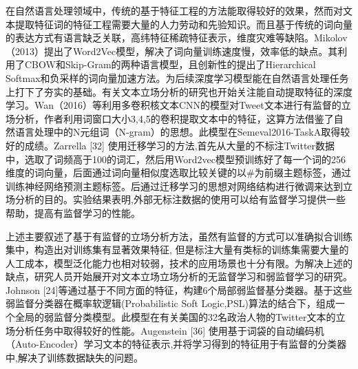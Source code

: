 在自然语言处理领域中，传统的基于特征工程的方法能取得较好的效果，然而对文本提取特征词的特征工程需要大量的人力劳动和先验知识。而且基于传统的词向量的表达方式有语言缺乏关联，高纬特征稀疏特征表示，维度灾难等缺陷。Mikolov（2013）提出了Word2Vec模型，解决了词向量训练速度慢，效率低的缺点。其利用了CBOW和Skip-Gram的两种语言模型，且创新性的提出了Hierarchical Softmax和负采样的词向量加速方法。为后续深度学习模型能在自然语言处理任务上打下了夯实的基础。有关文本立场分析的研究也开始关注能自动提取特征的深度学习。Wan（2016）等利用多卷积核文本CNN的模型对Tweet文本进行有监督的立场分析，作者利用词窗口大小3,4,5的卷积提取文本中的特征，这算方法借鉴了自然语言处理中的N元组词（N-gram）的思想。此模型在Semeval2016-TaskA取得较好的成绩。Zarrella [32] 使用迁移学习的方法,首先从大量的不标注Twitter数据中，选取了词频高于100的词汇，然后用Word2vec模型预训练好了每一个词的256维度的词向量，后面通过词向量相似度选取比较关键的以\#为前缀主题标签，通过训练神经网络预测主题标签。后通过迁移学习的思想对网络结构进行微调来达到立场分析的目的。实验结果表明,外部无标注数据的使用可以给有监督学习提供一些帮助，提高有监督学习的性能。

上述主要叙述了基于有监督的立场分析方法，虽然有监督的方式可以准确拟合训练集中，构造出对训练集有显著效果特征, 但是标注大量有类标的训练集需要大量的人工成本，模型泛化能力也相对较弱，技术的应用场景也十分有限。为解决上述的缺点，研究人员开始展开对文本立场立场分析的无监督学习和弱监督学习的研究。 Johnson [24]等通过基于不同方面的特征，构建6个局部弱监督基分类器。基于这些弱监督分类器在概率软逻辑(Probabilistic Soft Logic,PSL)算法的结合下，组成一个全局的弱监督分类模型。此模型在有关美国的32名政治人物的Twitter文本的立场分析任务中取得较好的性能。Augenstein [36] 使用基于词袋的自动编码机（Auto-Encoder）学习文本的特征表示,并将学习得到的特征用于有监督的分类器中,解决了训练数据缺失的问题。



